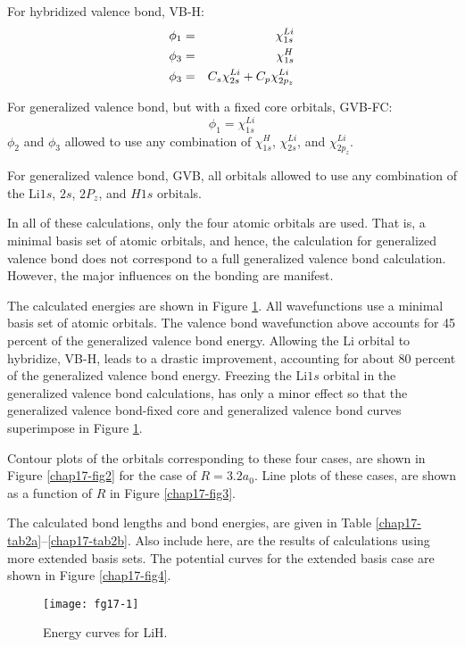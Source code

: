 For hybridized valence bond, VB-H:
\begin{eqnarray}
\phi_1 &=& \chi^{Li}_{1s}\cr
\phi_3 &=& \chi^H_{1s}\cr
\phi_3 &=& C_s \chi^{Li}_{2s} + C_p \chi^{Li}_{2p_z}
\end{eqnarray}

For generalized valence bond, but with a fixed core orbitals, GVB-FC:
\begin{equation}
\phi_1 = \chi^{Li}_{1s}
\end{equation}
$\phi_2$ and $\phi_3$ allowed to use any combination of 
$\chi^H_{1s}$, $\chi^{Li}_{2s}$, and $\chi^{Li}_{2p_z}$. 

For generalized valence bond, GVB, all orbitals allowed to use any
combination of the Li$1s$, $2s$, $2P_z$, and $H1s$ orbitals.

In all of these calculations, only the four atomic orbitals are used.
That is, a minimal basis set of atomic orbitals, and hence, the calculation 
for generalized valence bond does not correspond to a full generalized valence
bond calculation.  However, the major influences on the bonding are manifest.

The calculated energies are shown in Figure \ref{chap17-fig1}.  All
wavefunctions use a minimal basis set of atomic orbitals. The valence
bond wavefunction above accounts for 45 percent of the generalized
valence bond energy. Allowing the Li orbital to hybridize, VB-H, leads
to a drastic improvement, accounting for about 80 percent of the
generalized valence bond energy. Freezing the Li$1s$ orbital in the
generalized valence bond calculations, has only a minor effect so that
the generalized valence bond-fixed core and generalized valence bond
curves superimpose in Figure \ref{chap17-fig1}.

Contour plots of the orbitals corresponding to these four cases, are
shown in Figure \ref{chap17-fig2} for the case of $R = 3.2a_0$.  Line
plots of these cases, are shown as a function of $R$ in Figure
\ref{chap17-fig3}.

The calculated bond lengths and bond energies, are given in Table
\ref{chap17-tab2a}--\ref{chap17-tab2b}.  Also include here, are the
results of calculations using more extended basis sets. The potential
curves for the extended basis case are shown in Figure \ref{chap17-fig4}.

\begin{figure}
\texttt{[image: fg17-1]}
\caption{Energy curves for LiH.}
\label{chap17-fig1}
\end{figure}

